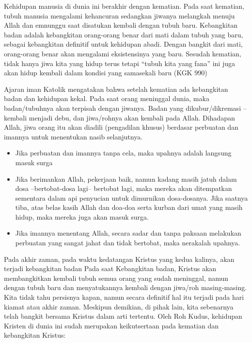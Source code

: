
Kehidupan manusia di dunia ini berakhir dengan kematian. Pada saat kematian, tubuh manusia mengalami kehancuran sedangkan jiwanya melangkah menuju Allah dan emnunggu saat disatukan kembali dengan tubuh baru. Kebangkitan badan adalah kebangkitan orang-orang benar dari mati dalam tubuh yang baru, sebagai kebangkitan definitif untuk kehidupan abadi. Dengan bangkit dari mati, orang-orang benar akan mengalami eksistensinya yang baru. Sesudah kematian, tidak hanya jiwa kita yang hidup terus tetapi ``tubuh kita yang fana'' ini juga akan hidup kembali dalam kondisi yang samasekali baru (KGK 990)

Ajaran iman Katolik mengatakan bahwa setelah kematian ada kebangkitan badan dan kehidupan kekal.
Pada saat orang meninggal dunia, maka badan/tubuhnya akan terpisah dengan jiwanya. Badan yang dikubur/dikremasi – kembali menjadi debu, dan jiwa/rohnya akan kembali pada Allah. Dihadapan Allah, jiwa orang itu akan diadili (pengadilan khusus) berdasar perbuatan dan imannya untuk menentukan nasib selanjutnya.
\begin{itemize}
\item Jika perbuatan dan imannya tanpa cela, maka upahnya adalah langsung masuk surga
\item Jika berimankan Allah, pekerjaan baik, namun kadang masih jatuh dalam dosa --bertobat-dosa lagi-- bertobat lagi, maka mereka akan ditempatkan sementara dalam api penyucian untuk dimurnikan dosa-dosanya. Jika saatnya tiba, atas belas kasih Allah dan doa-doa serta kurban dari umat yang masih hidup, maka mereka juga akan masuk surga.
\item Jika imannya menentang Allah, secara sadar dan tanpa paksaan melakukan perbuatan yang sangat jahat dan tidak bertobat, maka nerakalah upahnya.
\end{itemize}

Pada akhir zaman, pada waktu kedatangan Kristus yang kedua kalinya, akan terjadi kebangkitan badan
Pada saat Kebangkitan badan, Kristus akan membangkitkan kembali tubuh semua orang yang sudah meninggal, namun dengan tubuh baru dan menyatukannya kembali dengan jiwa/roh masing-masing. Kita tidak tahu persisnya kapan, namun secara definitif hal itu terjadi pada hari kiamat atau akhir zaman. Meskipun demikian, di pihak lain, kita sebenarnya telah bangkit bersama Kristus dalam arti tertentu. Oleh Roh Kudus, kehidupan Kristen di dunia ini sudah merupakan keikutsertaan pada kematian dan kebangkitan Kristus:

